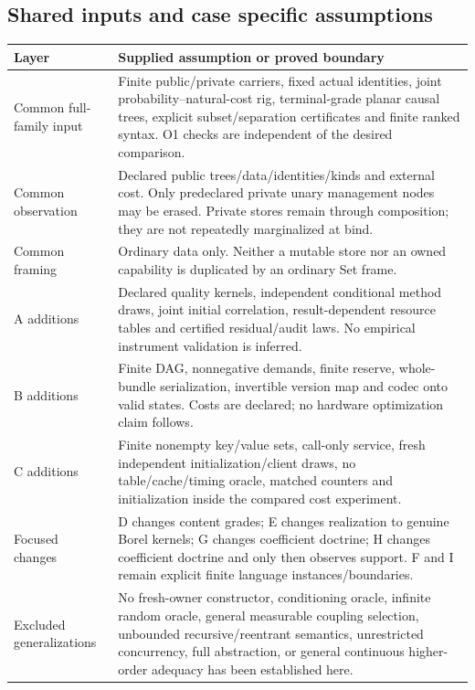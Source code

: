 \subsection{Shared inputs and case specific assumptions}
\begin{longtable}{@{}p{.28\linewidth}p{.61\linewidth}@{}}
\toprule Layer&Supplied assumption or proved boundary\\\midrule\endhead
Common full-family input&Finite public/private carriers, fixed actual
identities, joint probability--natural-cost rig, terminal-grade planar
causal trees, explicit subset/separation certificates and finite ranked
syntax. O1 checks are independent of the desired comparison.\\
Common observation&Declared public trees/data/identities/kinds and external
cost. Only predeclared private unary management nodes may be erased.
Private stores remain through composition; they are not repeatedly
marginalized at bind.\\
Common framing&Ordinary data only. Neither a mutable store nor an owned
capability is duplicated by an ordinary Set frame.\\
A additions&Declared quality kernels, independent conditional method draws,
joint initial correlation, result-dependent resource tables and certified
residual/audit laws. No empirical instrument validation is inferred.\\
B additions&Finite DAG, nonnegative demands, finite reserve, whole-bundle
serialization, invertible version map and codec onto valid states.
Costs are declared; no hardware optimization claim follows.\\
C additions&Finite nonempty key/value sets, call-only service, fresh
independent initialization/client draws, no table/cache/timing oracle,
matched counters and initialization inside the compared cost experiment.\\
Focused changes&D changes content grades; E changes realization to genuine
Borel kernels; G changes coefficient doctrine; H changes coefficient
doctrine and only then observes support. F and I remain explicit finite
language instances/boundaries.\\
Excluded generalizations&No fresh-owner constructor, conditioning oracle,
infinite random oracle, general measurable coupling selection, unbounded
recursive/reentrant semantics, unrestricted concurrency, full abstraction,
or general continuous higher-order adequacy has been established here.\\
\bottomrule
\end{longtable}

